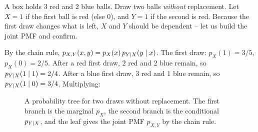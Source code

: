 \begin{example}
\label{ch13:ex-without-replacement}
A box holds $3$ red and $2$ blue balls. Draw two balls \emph{without}
replacement. Let $X=1$ if the first ball is red (else $0$), and $Y=1$ if the
second is red. Because the first draw changes what is left, $X$ and $Y$ should be
dependent -- let us build the joint PMF and confirm.

By the chain rule, $p_{X,Y}(x,y) = p_X(x)\,p_{Y\mid X}(y\mid x)$. The first
draw: $p_X(1) = 3/5$, $p_X(0) = 2/5$. After a red first draw, $2$ red and $2$
blue remain, so $p_{Y\mid X}(1\mid 1) = 2/4$. After a blue first draw, $3$ red
and $1$ blue remain, so $p_{Y\mid X}(1\mid 0) = 3/4$. Multiplying:

\begin{figure}[H]
\centering
{}
\caption{A probability tree for two draws without replacement. The first branch is the marginal $p_X$, the second branch is the conditional $p_{Y\mid X}$, and the leaf gives the joint PMF $p_{X,Y}$ by the chain rule.}
\label{ch13:fig-tree-without-replacement}
\end{figure}


\end{example}
